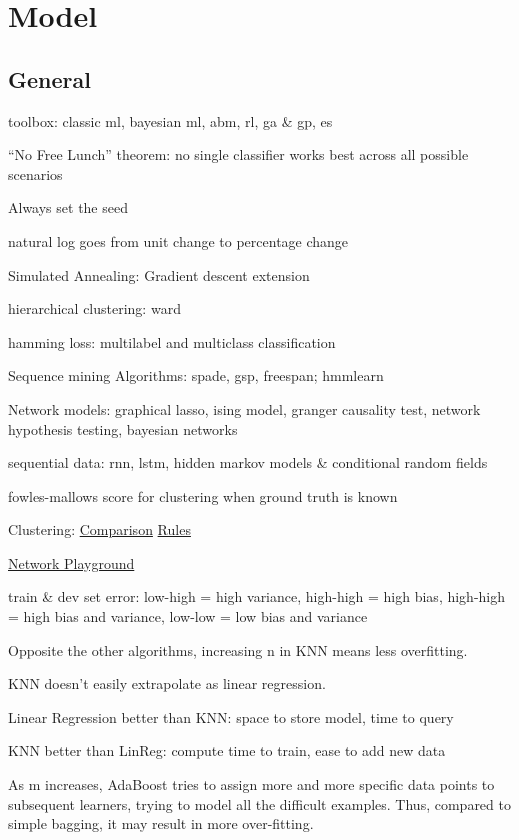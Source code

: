 \documentclass[]{book}
\begin{document}
\chapter{Model}\label{model-1}

\section{General}\label{general-4}

toolbox: classic ml, bayesian ml, abm, rl, ga \& gp, es

``No Free Lunch'' theorem: no single classifier works best across all
possible scenarios

Always set the seed

natural log goes from unit change to percentage change

Simulated Annealing: Gradient descent extension

hierarchical clustering: ward

hamming loss: multilabel and multiclass classification

Sequence mining Algorithms: spade, gsp, freespan; hmmlearn

Network models: graphical lasso, ising model, granger causality test,
network hypothesis testing, bayesian networks

sequential data: rnn, lstm, hidden markov models \& conditional random
fields

fowles-mallows score for clustering when ground truth is known

Clustering:
\href{http://scikit-learn.org/stable/modules/clustering.html\#clustering}{Comparison}
\textbar{}
\href{https://twitter.com/thomaswdinsmore/status/965223193043718145}{Rules}

\href{https://mikedombo.github.io/graphPlayground/\#}{Network
Playground}

train \& dev set error: low-high = high variance, high-high = high bias,
high-high = high bias and variance, low-low = low bias and variance

Opposite the other algorithms, increasing n in KNN means less
overfitting.

KNN doesn't easily extrapolate as linear regression.

Linear Regression better than KNN: space to store model, time to query

KNN better than LinReg: compute time to train, ease to add new data

As m increases, AdaBoost tries to assign more and more specific data
points to subsequent learners, trying to model all the difficult
examples. Thus, compared to simple bagging, it may result in more
over-fitting.
\end{document}
